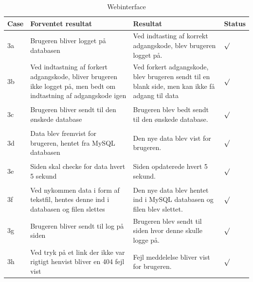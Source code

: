\begin{table}[H]
\caption{Webinterface}
\centering
\begin{tabular}{| p{1cm}  | p{6cm} | p{5cm} | p{1cm} |}
\hline
Case &Forventet resultat &Resultat &Status\\\hline
3a &Brugeren bliver logget på databasen  & Ved indtasting af korrekt adgangskode, blev brugeren logget på. &\begin{Huge}$\surd$\end{Huge} \\\hline 
3b &Ved indtastning af forkert adgangskode, bliver brugeren ikke logget på, men bedt om indtastning af adgangskode igen   & Ved forkert adgangskode, blev brugeren sendt til en blank side, men kan ikke få adgang til data &\begin{Huge}$\surd$\end{Huge} \\\hline
3c &Brugeren bliver sendt til den ønskede database  & Brugeren blev bedt sendt til den ønskede database. &\begin{Huge}$\surd$\end{Huge} \\\hline
3d &Data blev fremvist for brugeren, hentet fra MySQL databasen & Den nye data blev vist for brugeren. &\begin{Huge}$\surd$\end{Huge} \\\hline
3e &Siden skal checke for data hvert 5 sekund & Siden opdaterede hvert 5 sekund. &\begin{Huge}$\surd$\end{Huge} \\\hline
3f &Ved nykommen data i form af tekstfil, hentes denne ind i databasen og filen slettes & Den nye data blev hentet ind i MySQL databasen og filen blev slettet. &\begin{Huge}$\surd$\end{Huge} \\\hline
3g &Brugeren bliver sendt til log på siden & Brugeren blev sendt til siden hvor denne skulle logge på. &\begin{Huge}$\surd$\end{Huge} \\\hline
3h &Ved tryk på et link der ikke var rigtigt henvist bliver en 404 fejl vist & Fejl meddelelse bliver vist for brugeren. &\begin{Huge}$\surd$\end{Huge} \\\hline
\end{tabular}
\end{table}

